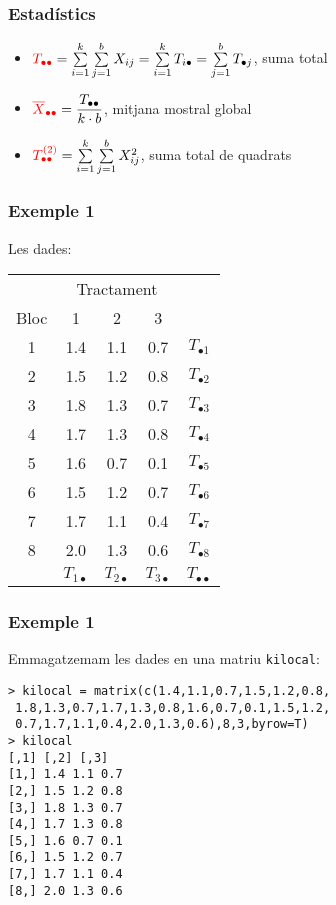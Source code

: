 \documentclass[12pt,t]{beamer}
\newcommand{\red}[1]{\textcolor{red}{#1}}
\theoremstyle{plain}
\theoremstyle{definition}
\begin{document}
\begin{frame}
\frametitle{Estadístics}
\begin{itemize}

\item $\red{T_{\bullet\bullet}}=\sum\limits_{i=1}^k\sum\limits_{j=1}^b X_{ij}=\sum\limits_{i=1}^k
T_{i\bullet}= \sum\limits_{j=1}^b T_{\bullet j}$, suma total
\medskip

\item $\red{\overline{X}_{\bullet\bullet}}=\dfrac{T_{\bullet\bullet}}{k\cdot b}$,
mitjana mostral global
\medskip

\item $\red{T^{(2)}_{\bullet\bullet}}=\sum\limits_{i=1}^k\sum\limits_{j=1}^b X_{ij}^2$, suma total de quadrats 
\end{itemize}
\end{frame}


\begin{frame}
\frametitle{Exemple 1}
Les dades:

\begin{center}
\begin{tabular}{ccccc}
\cline{1-4}
&\multicolumn{3}{c}{Tractament} & \\\cline{1-4}
Bloc &1 &2 &3  & \\\cline{1-4}
1&1.4&1.1&0.7 & $T_{\bullet1}$\\
2&1.5&1.2&0.8& $T_{\bullet2}$\\
3&1.8&1.3&0.7& $T_{\bullet3}$\\
4&1.7&1.3&0.8& $T_{\bullet4}$\\
5&1.6&0.7&0.1& $T_{\bullet5}$\\
6&1.5&1.2&0.7& $T_{\bullet6}$\\
7&1.7&1.1&0.4& $T_{\bullet7}$\\
8&2.0&1.3&0.6& $T_{\bullet8}$\\\cline{1-4}
 & $T_{1\bullet}$ & $T_{2\bullet}$ & $T_{3\bullet}$ & $T_{\bullet\bullet}$
\end{tabular}
\end{center}
\end{frame}


\begin{frame}[fragile]
\frametitle{Exemple 1}
Emmagatzemam les dades en una matriu {\tt kilocal}:
\begin{verbatim}
> kilocal = matrix(c(1.4,1.1,0.7,1.5,1.2,0.8,
 1.8,1.3,0.7,1.7,1.3,0.8,1.6,0.7,0.1,1.5,1.2,
 0.7,1.7,1.1,0.4,2.0,1.3,0.6),8,3,byrow=T)
> kilocal
[,1] [,2] [,3]
[1,] 1.4 1.1 0.7
[2,] 1.5 1.2 0.8
[3,] 1.8 1.3 0.7
[4,] 1.7 1.3 0.8
[5,] 1.6 0.7 0.1
[6,] 1.5 1.2 0.7
[7,] 1.7 1.1 0.4
[8,] 2.0 1.3 0.6
\end{verbatim}
\end{frame}
\end{document}

